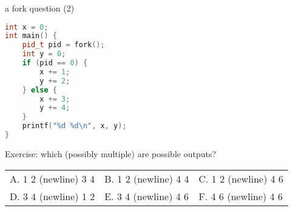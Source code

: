 
\begin{frame}[fragile,label=forkQuestion]{a fork question (2)}
\vspace{-.3cm}
\begin{lstlisting}[language=C++,style=size10]
int x = 0;
int main() {
    pid_t pid = fork();
    int y = 0;
    if (pid == 0) {
        x += 1;
        y += 2;
    } else {
        x += 3;
        y += 4;
    }
    printf("%d %d\n", x, y);
}
\end{lstlisting}
\small Exercise: which (possibly multiple) are possible outputs?
\begin{tabular}{lll}
A. 1 2 (newline) 3 4 &
B. 1 2 (newline) 4 4 &
C. 1 2 (newline) 4 6 \\
D. 3 4 (newline) 1 2 &
E. 3 4 (newline) 4 6 &
F. 4 6 (newline) 4 6 \\
\end{tabular}
\end{frame}
